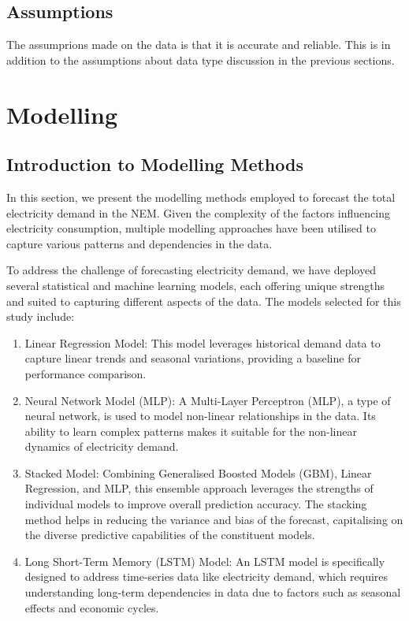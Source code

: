 \documentclass[mstat,12pt]{unswthesis}
\providecommand{\tightlist}{%
  \setlength{\itemsep}{0pt}\setlength{\parskip}{0pt}}
\begin{document}
\subsection{Assumptions}\label{assumptions}

The assumprions made on the data is that it is accurate and reliable.
This is in addition to the assumptions about data type discussion in the
previous sections.

\section{Modelling}\label{modelling}

\subsection{Introduction to Modelling
Methods}\label{introduction-to-modelling-methods}

In this section, we present the modelling methods employed to forecast
the total electricity demand in the NEM. Given the complexity of the
factors influencing electricity consumption, multiple modelling
approaches have been utilised to capture various patterns and
dependencies in the data.

To address the challenge of forecasting electricity demand, we have
deployed several statistical and machine learning models, each offering
unique strengths and suited to capturing different aspects of the data.
The models selected for this study include:

\begin{enumerate}
\def\labelenumi{\arabic{enumi}.}
\tightlist
\item
  Linear Regression Model: This model leverages historical demand data
  to capture linear trends and seasonal variations, providing a baseline
  for performance comparison.
\item
  Neural Network Model (MLP): A Multi-Layer Perceptron (MLP), a type of
  neural network, is used to model non-linear relationships in the data.
  Its ability to learn complex patterns makes it suitable for the
  non-linear dynamics of electricity demand.
\item
  Stacked Model: Combining Generalised Boosted Models (GBM), Linear
  Regression, and MLP, this ensemble approach leverages the strengths of
  individual models to improve overall prediction accuracy. The stacking
  method helps in reducing the variance and bias of the forecast,
  capitalising on the diverse predictive capabilities of the constituent
  models.
\item
  Long Short-Term Memory (LSTM) Model: An LSTM model is specifically
  designed to address time-series data like electricity demand, which
  requires understanding long-term dependencies in data due to factors
  such as seasonal effects and economic cycles.
\end{enumerate}
\end{document}
